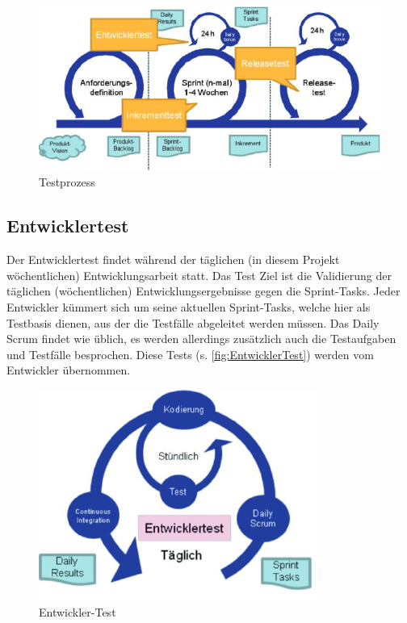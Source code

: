 \begin{figure}[!htb]
  \centering
  \includegraphics[width=.9\textwidth]{figures/rebecca/Testprozess.png}
  \caption[]{Testprozess}
  \label{fig:TestProzessBild}
\end{figure}

\subsection{Entwicklertest}
\label{sub:EntwicklerTest}

Der Entwicklertest findet während der täglichen (in diesem Projekt wöchentlichen) Entwicklungsarbeit statt. Das Test Ziel ist die Validierung der täglichen (wöchentlichen) Entwicklungsergebnisse gegen die Sprint-Tasks. Jeder Entwickler kümmert sich um seine aktuellen Sprint-Tasks, welche hier als Testbasis dienen, aus der die Testfälle abgeleitet werden müssen. Das Daily Scrum findet wie üblich, es werden allerdings zusätzlich auch die Testaufgaben und Testfälle besprochen. Diese Tests (s. \autoref{fig:EntwicklerTest}) werden vom Entwickler übernommen.

\begin{figure}[!htb]
  \centering
  \includegraphics[width=.9\textwidth]{figures/rebecca/Entwickler_Test.png}
  \caption[]{Entwickler-Test}
  \label{fig:EntwicklerTest}
\end{figure}

